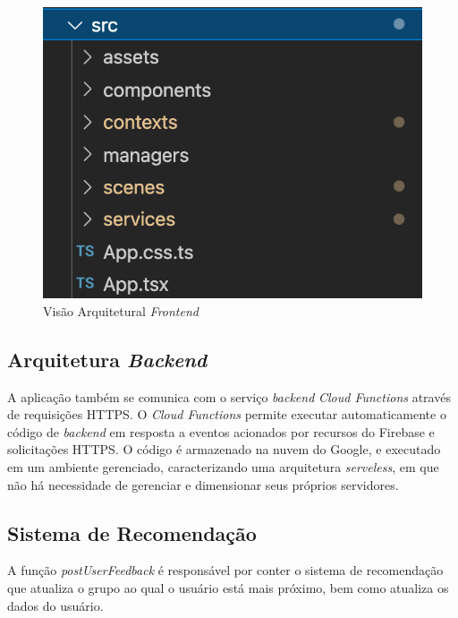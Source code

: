 \begin{figure}[htbp]
	\caption{Visão Arquitetural \emph{Frontend}}
	\begin{center}
	\includegraphics[keepaspectratio=true,scale=0.6]{figuras/frontend.png}
	\end{center}
    \label{fig13}
\end{figure}

\subsection{Arquitetura \emph{Backend}}

A aplicação também se comunica com o serviço \emph{backend} \emph{Cloud Functions} através de requisições HTTPS.
O \emph{Cloud Functions} permite executar automaticamente o código de \emph{backend} em resposta a 
eventos acionados por recursos do Firebase e solicitações HTTPS. 
O código é armazenado na nuvem do Google, e executado em um ambiente gerenciado, caracterizando 
uma arquitetura \emph{serveless}, em que não há necessidade de gerenciar e dimensionar seus 
próprios servidores. 


\subsection{Sistema de Recomendação}
\label{sr}

A função \emph{postUserFeedback} é responsável por conter o sistema de 
recomendação que atualiza o grupo ao qual o usuário está mais próximo, bem como atualiza os dados do usuário. 

